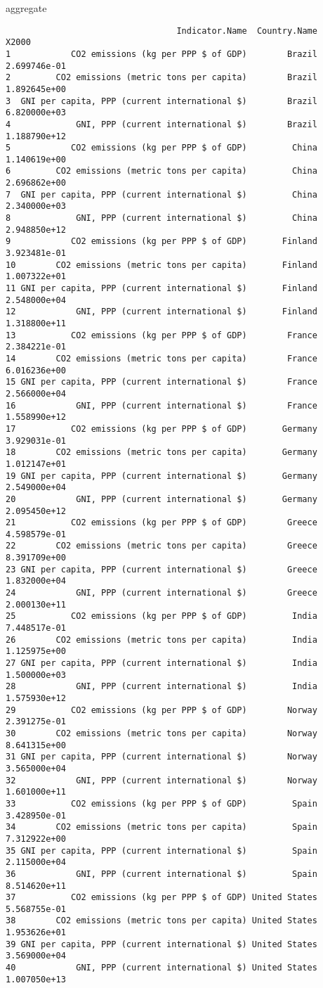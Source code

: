 \documentclass[xcolor={usenames,svgnames,dvipsnames}]{beamer}
\begin{document}
\begin{frame}[fragile,label=sec-3-6]{aggregate}
\begin{verbatim}
                                  Indicator.Name  Country.Name        X2000
1            CO2 emissions (kg per PPP $ of GDP)        Brazil 2.699746e-01
2         CO2 emissions (metric tons per capita)        Brazil 1.892645e+00
3  GNI per capita, PPP (current international $)        Brazil 6.820000e+03
4             GNI, PPP (current international $)        Brazil 1.188790e+12
5            CO2 emissions (kg per PPP $ of GDP)         China 1.140619e+00
6         CO2 emissions (metric tons per capita)         China 2.696862e+00
7  GNI per capita, PPP (current international $)         China 2.340000e+03
8             GNI, PPP (current international $)         China 2.948850e+12
9            CO2 emissions (kg per PPP $ of GDP)       Finland 3.923481e-01
10        CO2 emissions (metric tons per capita)       Finland 1.007322e+01
11 GNI per capita, PPP (current international $)       Finland 2.548000e+04
12            GNI, PPP (current international $)       Finland 1.318800e+11
13           CO2 emissions (kg per PPP $ of GDP)        France 2.384221e-01
14        CO2 emissions (metric tons per capita)        France 6.016236e+00
15 GNI per capita, PPP (current international $)        France 2.566000e+04
16            GNI, PPP (current international $)        France 1.558990e+12
17           CO2 emissions (kg per PPP $ of GDP)       Germany 3.929031e-01
18        CO2 emissions (metric tons per capita)       Germany 1.012147e+01
19 GNI per capita, PPP (current international $)       Germany 2.549000e+04
20            GNI, PPP (current international $)       Germany 2.095450e+12
21           CO2 emissions (kg per PPP $ of GDP)        Greece 4.598579e-01
22        CO2 emissions (metric tons per capita)        Greece 8.391709e+00
23 GNI per capita, PPP (current international $)        Greece 1.832000e+04
24            GNI, PPP (current international $)        Greece 2.000130e+11
25           CO2 emissions (kg per PPP $ of GDP)         India 7.448517e-01
26        CO2 emissions (metric tons per capita)         India 1.125975e+00
27 GNI per capita, PPP (current international $)         India 1.500000e+03
28            GNI, PPP (current international $)         India 1.575930e+12
29           CO2 emissions (kg per PPP $ of GDP)        Norway 2.391275e-01
30        CO2 emissions (metric tons per capita)        Norway 8.641315e+00
31 GNI per capita, PPP (current international $)        Norway 3.565000e+04
32            GNI, PPP (current international $)        Norway 1.601000e+11
33           CO2 emissions (kg per PPP $ of GDP)         Spain 3.428950e-01
34        CO2 emissions (metric tons per capita)         Spain 7.312922e+00
35 GNI per capita, PPP (current international $)         Spain 2.115000e+04
36            GNI, PPP (current international $)         Spain 8.514620e+11
37           CO2 emissions (kg per PPP $ of GDP) United States 5.568755e-01
38        CO2 emissions (metric tons per capita) United States 1.953626e+01
39 GNI per capita, PPP (current international $) United States 3.569000e+04
40            GNI, PPP (current international $) United States 1.007050e+13
\end{verbatim}
\end{frame}
\end{document}

